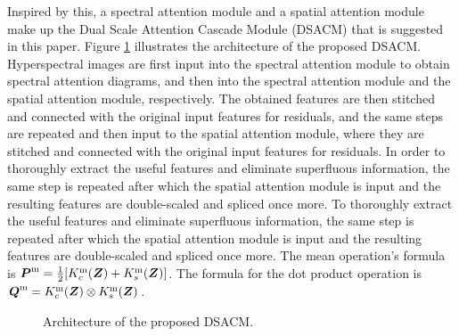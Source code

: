 \documentclass[]{interact}
\theoremstyle{plain}%
\theoremstyle{definition}
\theoremstyle{remark}
\begin{document}
Inspired by this, a spectral attention module and a spatial attention module make up the Dual Scale Attention Cascade Module (DSACM) that is suggested in this paper. Figure \ref{fig:4} illustrates the architecture of the proposed DSACM. Hyperspectral images are first input into the spectral attention module to obtain spectral attention diagrams, and then into the spectral attention module and the spatial attention module, respectively. The obtained features are then stitched and connected with the original input features for residuals, and the same steps are repeated and then input to the spatial attention module, where they are stitched and connected with the original input features for residuals. In order to thoroughly extract the useful features and eliminate superfluous information, the same step is repeated after which the spatial attention module is input and the resulting features are double-scaled and spliced once more. To thoroughly extract the useful features and eliminate superfluous information, the same step is repeated after which the spatial attention module is input and the resulting features are double-scaled and spliced once more. The mean operation's formula is ${\boldsymbol P}^{\rm m}= \frac 12[K_c^{\rm m} ({\boldsymbol Z})+K_s^{\rm m} ({\boldsymbol Z})]$. The formula for the dot product operation is ${\boldsymbol Q}^{\rm m}=K_c^{\rm m} ({\boldsymbol Z}) \otimes K_s^{\rm m} ({\boldsymbol Z})$.

\begin{figure}[H]
\centering
{}
\caption{Architecture of the proposed DSACM.}\label{fig:4}
\end{figure} 
\end{document}
